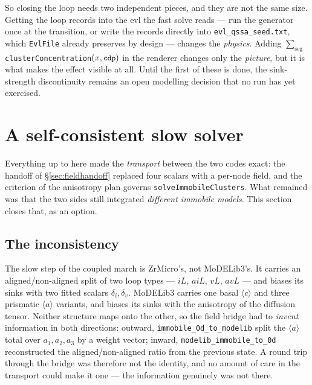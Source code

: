\documentclass[11pt,a4paper]{article}
\newcommand{\code}[1]{\texttt{\small #1}}
\newcommand{\aloop}{\ensuremath{\langle a\rangle}}
\newcommand{\cloop}{\ensuremath{\langle c\rangle}}
\begin{document}
So closing the loop needs two independent pieces, and they are not the same
size. Getting the loop records into the evl the fast solve reads --- run the
generator once at the transition, or write the records directly into
\code{evl\_qssa\_seed.txt}, which \code{EvlFile} already preserves by design ---
changes the \emph{physics}. Adding $\sum_{\text{seg}}$
\code{clusterConcentration}$(x, \code{cdp})$ in the renderer changes only the
\emph{picture}, but it is what makes the effect visible at all. Until the first
of these is done, the sink-strength discontinuity remains an open modelling
decision that no run has yet exercised.

\section{A self-consistent slow solver}
\label{sec:selfconsistent}

Everything up to here made the \emph{transport} between the two codes exact: the
handoff of \S\ref{sec:fieldhandoff} replaced four scalars with a per-node field,
and the criterion of the anisotropy plan governs \code{solveImmobileClusters}.
What remained was that the two sides still integrated \emph{different immobile
models}. This section closes that, as an option.

\subsection{The inconsistency}

The slow step of the coupled march is ZrMicro's, not MoDELib3's. It carries an
aligned/non-aligned split of two loop types --- $iL$, $aiL$, $vL$, $avL$ --- and
biases its sinks with two fitted scalars $\delta_i, \delta_v$. MoDELib3 carries
one basal \cloop{} and three prismatic \aloop{} variants, and biases its sinks
with the anisotropy of the diffusion tensor. Neither structure maps onto the
other, so the field bridge had to \emph{invent} information in both directions:
outward, \code{immobile\_0d\_to\_modelib} split the \aloop{} total over
$a_1,a_2,a_3$ by a weight vector; inward,
\code{modelib\_immobile\_to\_0d} reconstructed the aligned/non-aligned ratio
from the previous state. A round trip through the bridge was therefore not the
identity, and no amount of care in the transport could make it one --- the
information genuinely was not there.
\end{document}
